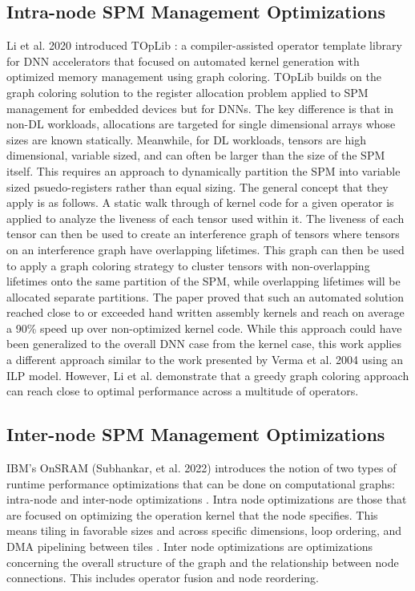 \subsection{Intra-node SPM Management Optimizations}
Li et al. 2020 introduced TOpLib \cite{toplib}: a compiler-assisted operator
template library for DNN accelerators that focused on automated kernel
generation with optimized memory management using graph coloring. TOpLib builds
on the graph coloring solution to the register allocation problem applied to
SPM management for embedded devices but for DNNs. The key difference is that in
non-DL workloads, allocations are targeted for single dimensional arrays whose
sizes are known statically. Meanwhile, for DL workloads, tensors are high
dimensional, variable sized, and can often be larger than the size of the SPM
itself.  This requires an approach to dynamically partition the SPM into
variable sized psuedo-registers rather than equal sizing. The general concept
that they apply is as follows. A static walk through of kernel code for a given
operator is applied to analyze the liveness of each tensor used within it.  The
liveness of each tensor can then be used to create an interference graph of
tensors where tensors on an interference graph have overlapping lifetimes.
This graph can then be used to apply a graph coloring strategy to cluster
tensors with non-overlapping lifetimes onto the same partition of the SPM,
while overlapping lifetimes will be allocated separate partitions. The paper
proved that such an automated solution reached close to or exceeded hand
written assembly kernels and reach on average a 90\% speed up over
non-optimized kernel code.  While this approach could have been generalized to
the overall DNN case from the kernel case, this work applies a different
approach similar to the work presented by Verma et al. 2004 using an ILP model.
However, Li et al. demonstrate that a greedy graph coloring approach can reach
close to optimal performance across a multitude of operators.


\subsection{Inter-node SPM Management Optimizations}

IBM's OnSRAM (Subhankar, et al. 2022) introduces the notion of two types of
runtime performance optimizations that can be done on computational graphs:
intra-node and inter-node optimizations \cite{onsram}. Intra node optimizations
are those that are focused on optimizing the operation kernel that the node
specifies. This means tiling in favorable sizes and across specific dimensions,
loop ordering, and DMA pipelining between tiles \cite{aladdin}.
Inter node optimizations are optimizations concerning the overall structure 
of the graph and the relationship between node connections. This includes
operator fusion and node reordering\cite{onsram}. 

